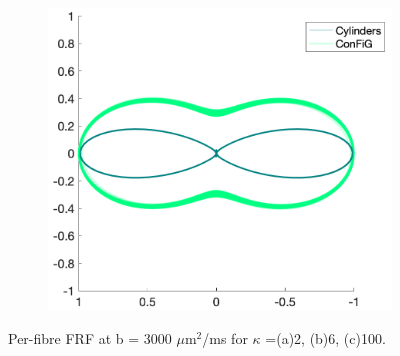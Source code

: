 \begin{figure}
\begin{subfigure}[]{0.32\textwidth}
    \caption{}
  \end{subfigure}
  ~
  \begin{subfigure}[]{0.32\textwidth}
    \includegraphics[width=\textwidth]{figures/frf_experiment/kappa_100_b_3000.png}
    \caption{}
  \end{subfigure}

  \caption{Per-fibre FRF at b = 3000 $\mu$m$^2$/ms for $\kappa$ =(a)2, (b)6, (c)100.}
  \label{fig:frf_per_fibre_b3000}
\end{figure}


